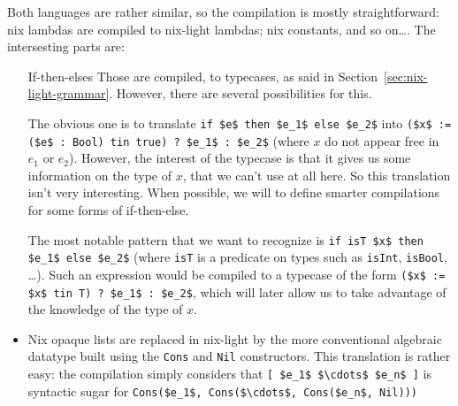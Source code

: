 Both languages are rather similar, so the compilation is mostly
straightforward: nix lambdas are compiled to nix-light lambdas; nix constants,
and so on\ldots. The intersesting parts are:

\begin{itemize}
  \item[If-then-elses] Those are compiled, to typecases, as said in
    Section~\ref{sec:nix-light-grammar}. However, there are several
    possibilities for this.

    The obvious one is to translate \lstinline{if $e$ then $e_1$ else $e_2$} into
    \lstinline{($x$ := ($e$ : Bool) tin true) ? $e_1$ : $e_2$} (where $x$ do not appear
    free in $e_1$ or $e_2$).
    However, the interest of the typecase is that it gives us some information
    on the type of $x$, that we can't use at all here. So this translation
    isn't very interesting.
    When possible, we will  to define smarter compilations for some forms of
    if-then-else.

    The most notable pattern that we want to recognize is
    \lstinline{if isT $x$ then $e_1$ else $e_2$}
    (where \lstinline{isT} is a predicate on types such as
    \lstinline{isInt}, \lstinline{isBool}, \ldots).
    Such an expression would be compiled to a typecase of the form
    \lstinline{($x$ := $x$ tin T) ? $e_1$ : $e_2$}, which will later allow us to take
    advantage of the knowledge of the type of $x$.

  \item[Lists] Nix opaque lists are replaced in nix-light by the more
    conventional algebraic datatype built using the \lstinline{Cons} and
    \lstinline{Nil} constructors.
    This translation is rather easy: the compilation simply considers that
    \lstinline{[ $e_1$ $\cdots$ $e_n$ ]} is syntactic sugar for
    \lstinline{Cons($e_1$, Cons($\cdots$, Cons($e_n$, Nil)))} %
\end{itemize}
